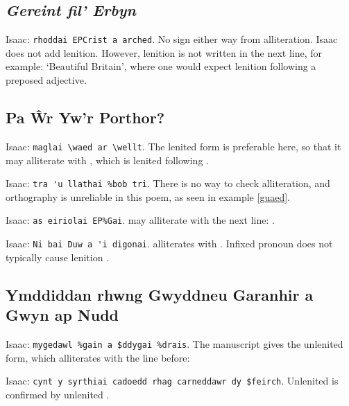 \subsection{\textit{Gereint fil' Erbyn}}
Isaac: \verb|rhoddai EPCrist a arched|. No sign either way from alliteration. Isaac does not add lenition. However, lenition is not written in the next line, for example:  `Beautiful Britain', where one would expect lenition following a preposed adjective.

\subsection{Pa \^{W}r Yw'r Porthor?}
Isaac: \verb|maglai \waed ar \wellt|. The lenited form is preferable here, so that it may alliterate with , which is lenited following .

Isaac: \verb|tra 'u llathai %bob tri|. There is no way to check alliteration, and orthography is unreliable in this poem, as seen in example \ref{guaed}.

Isaac: \verb|as eiriolai EP%Gai|.  may alliterate with the next line: .

Isaac: \verb|Ni bai Duw a 'i digonai|.  alliterates with . Infixed pronoun  does not typically cause lenition \parencite[§58]{evans_grammar_1964}. 

\subsection{Ymddiddan rhwng Gwyddneu Garanhir a Gwyn ap Nudd}
Isaac: \verb|mygedawl %gain a $ddygai %drais|. The manuscript gives the unlenited form, which alliterates with the line before: 

Isaac: \verb|cynt y syrthiai cadoedd rhag carneddawr dy $feirch|. Unlenited  is confirmed by unlenited .

